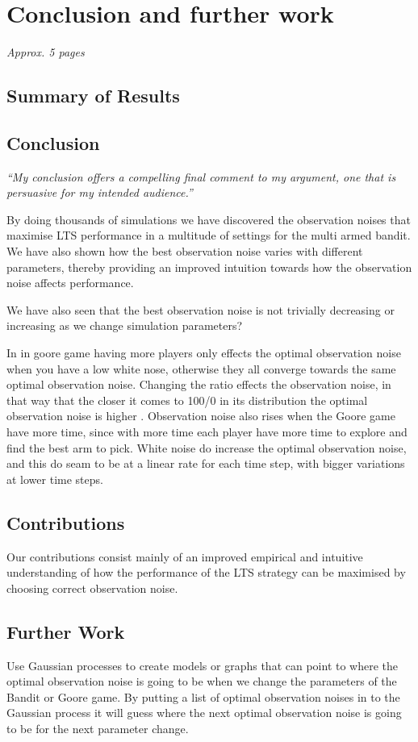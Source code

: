 \chapter{Conclusion and further work}
\label{ch:conclusion}
\textit{Approx. 5 pages}

\section{Summary of Results}

\section{Conclusion}
\emph{“My conclusion offers a compelling final comment to my argument, one that is persuasive for my intended audience.”}

By doing thousands of simulations we have discovered the observation noises that maximise LTS performance in a multitude of settings for the multi armed bandit.
We have also shown how the best observation noise varies with different parameters, thereby providing an improved intuition towards how the observation noise affects performance.

We have also seen that the best observation noise is not trivially decreasing or increasing as we change simulation parameters?

In in goore game having more players only effects the optimal observation noise when you have a low white nose,
otherwise they all converge towards the same optimal observation noise. Changing the ratio effects the observation
noise, in that way that the closer it comes to 100/0 in its distribution the optimal observation noise is higher .
Observation noise also rises when the Goore game have more time, since with more time each player have more time to explore
and find the best arm to pick. White noise do increase the optimal observation noise, and this do seam to be at a
linear rate for each time step, with bigger variations at lower time steps.

\section{Contributions}
Our contributions consist mainly of an improved empirical and intuitive understanding of how the performance of the LTS strategy can be maximised by choosing correct observation noise.


\section{Further Work}
Use Gaussian processes to create models or graphs that can point to where the optimal observation noise is going to be
when we change the parameters of the Bandit or Goore game. By putting a list of optimal observation noises in to the
Gaussian process it will guess where the next optimal observation noise is going to be for the next parameter change.

